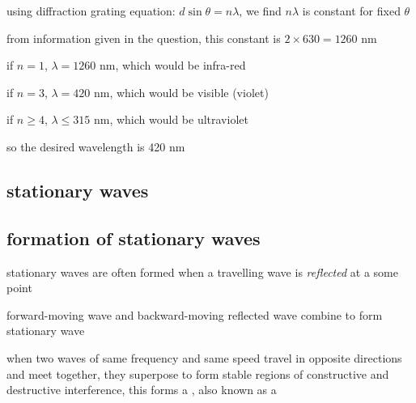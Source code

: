 
\begin{soln} using diffraction grating equation: $d \sin\theta = n\lambda$, we find $n\lambda$ is constant for fixed $\theta$

from information given in the question, this constant is $ 2\times630 = 1260 \text{ nm}$

if $n=1$, $\lambda = 1260 \text{ nm}$, which would be infra-red

if $n=3$, $\lambda = 420 \text{ nm}$, which would be visible (violet)

if $n\geq 4$, $\lambda \leq 315 \text{ nm}$, which would be ultraviolet

so the desired wavelength is 420 nm \end{soln}







\subsection{stationary waves}

\subsection{formation of stationary waves}

stationary waves are often formed when a travelling wave is \emph{reflected} at a some point

forward-moving wave and backward-moving reflected wave combine to form stationary wave

\begin{ilight}
	when two waves of same frequency and same speed travel in opposite directions and meet together, they superpose to form stable regions of constructive and destructive interference, this forms a , also known as a 
\end{ilight}

